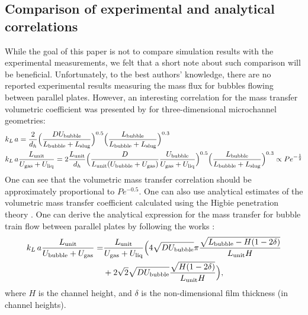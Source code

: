 \documentclass{article}
\newcommand{\beq}{\begin{equation}}
\newcommand{\feq}{\end{equation}}
\newcommand{\beqal}{\begin{equation}\begin{aligned}}
\newcommand{\feqal}{\end{aligned}\end{equation}}
\newcommand{\vol}{k_L\,a}
\newcommand{\lbubble}{L_{\mathrm{bubble}}}
\newcommand{\lunit}{L_{\mathrm{unit}}}
\newcommand{\lslug}{L_{\mathrm{slug}}}
\newcommand{\ububble}{U_{\mathrm{bubble}}}
\newcommand{\uliq}{U_{\mathrm{liq}}}
\newcommand{\ugas}{U_{\mathrm{gas}}}
\newcommand{\volnondim}{\vol \frac{\lunit}{\ububble+\ugas}}
\begin{document}
\subsection{Comparison of experimental and analytical correlations}
While the goal of this paper is not to compare simulation results with the experimental measurements, 
we felt that a short note about such comparison will be beneficial.
Unfortunately, to the best authors' knowledge, there are no reported experimental results measuring the mass flux for
  bubbles flowing between parallel plates. However, an interesting
correlation for the mass transfer volumetric coefficient was presented by
\citet{yue-mass} for three-dimensional microchannel geometries:
\beqal
&\vol=\frac{2}{d_h}\Bigl(\frac{D \ububble}{\lbubble+\lslug}\Bigr)^{0.5}
\Bigl(\frac{\lbubble}{\lbubble+\lslug}\Bigr)^{0.3}\\
&\vol \frac{\lunit}{\ugas+\uliq}=2\frac{\lunit}{d_h} \Bigl(\frac{D 
}{\lunit (\ububble+\ugas)} \frac{\ububble}{\ugas+\uliq}\Bigr)^{0.5}
\Bigl(\frac{\lbubble}{\lbubble+\lslug}\Bigr)^{0.3} \propto Pe^{-\frac{1}{2}}\\
\feqal
One can see that  the volumetric mass transfer correlation should be approximately proportional to
$Pe^{-0.5}$.  One can also use analytical estimates of the volumetric mass transfer
coefficient calculated using the Higbie penetration theory \cite{higbie}. One can derive the analytical expression for the mass transfer for bubble train flow between parallel plates by following the works
\cite{irandoust,vanbaten-circular}:
\beq
\label{vanbaten:analytical:expresssion}
\begin{aligned}
\volnondim=&\frac{\lunit}{\ugas+\uliq}\Bigl(4 \sqrt{D \ububble}{\pi}
\frac{\sqrt{\lbubble-H (1-2\delta)}}{\lunit H}\\
&+2 \sqrt{2} \sqrt{D \ububble} \frac{\sqrt{H
(1-2\delta)}}{\lunit H}\Bigr),
\end{aligned}
\feq
where $H$ is the channel height, and $\delta$ is the non-dimensional film thickness (in channel heights).
\end{document}
